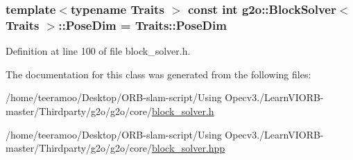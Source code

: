 \subsubsection[{\texorpdfstring{Pose\+Dim}{PoseDim}}]{\setlength{\rightskip}{0pt plus 5cm}template$<$typename Traits $>$ const int {\bf g2o\+::\+Block\+Solver}$<$ Traits $>$\+::Pose\+Dim = Traits\+::\+Pose\+Dim\hspace{0.3cm}{\ttfamily [static]}}\hypertarget{classg2o_1_1BlockSolver_a9a68f557c8e04cd76565fc45e1747e45}{}\label{classg2o_1_1BlockSolver_a9a68f557c8e04cd76565fc45e1747e45}


Definition at line 100 of file block\+\_\+solver.\+h.



The documentation for this class was generated from the following files\+:\begin{DoxyCompactItemize}
\item 
/home/teeramoo/\+Desktop/\+O\+R\+B-\/slam-\/script/\+Using Opecv3./\+Learn\+V\+I\+O\+R\+B-\/master/\+Thirdparty/g2o/g2o/core/\hyperlink{block__solver_8h}{block\+\_\+solver.\+h}\item 
/home/teeramoo/\+Desktop/\+O\+R\+B-\/slam-\/script/\+Using Opecv3./\+Learn\+V\+I\+O\+R\+B-\/master/\+Thirdparty/g2o/g2o/core/\hyperlink{block__solver_8hpp}{block\+\_\+solver.\+hpp}\end{DoxyCompactItemize}
